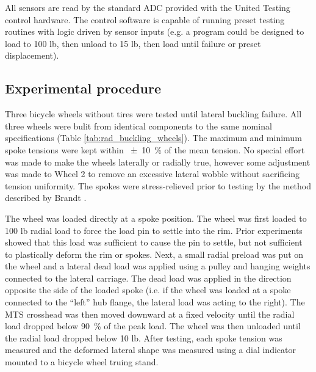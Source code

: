 \documentclass[\rootdir/thesis.tex]{subfiles}
\begin{document}
All sensors are read by the standard ADC provided with the United Testing control hardware. The control software is capable of running preset testing routines with logic driven by sensor inputs (e.g. a program could be designed to load to 100 lb, then unload to 15 lb, then load until failure or preset displacement).

\subsection{Experimental procedure}

Three bicycle wheels without tires were tested until lateral buckling failure. All three wheels were bulit from identical components to the same nominal specifications (Table \ref{tab:rad_buckling_wheels}). The maximum and minimum spoke tensions were kept within \SI{+-10}{\percent} of the mean tension. No special effort was made to make the wheels laterally or radially true, however some adjustment was made to Wheel 2 to remove an excessive lateral wobble without sacrificing tension uniformity. The spokes were stress-relieved prior to testing by the method described by Brandt \cite{Brandt1993}.

The wheel was loaded directly at a spoke position. The wheel was first loaded to 100 lb radial load to force the load pin to settle into the rim. Prior experiments showed that this load was sufficient to cause the pin to settle, but not sufficient to plastically deform the rim or spokes. Next, a small radial preload was put on the wheel and a lateral dead load was applied using a pulley and hanging weights connected to the lateral carriage. The dead load was applied in the direction opposite the side of the loaded spoke (i.e. if the wheel was loaded at a spoke connected to the ``left'' hub flange, the lateral load was acting to the right). The MTS crosshead was then moved downward at a fixed velocity until the radial load dropped below \SI{90}{\percent} of the peak load. The wheel was then unloaded until the radial load dropped below 10 lb. After testing, each spoke tension was measured and the deformed lateral shape was measured using a dial indicator mounted to a bicycle wheel truing stand.
\end{document}
